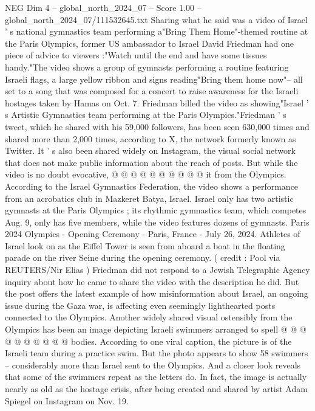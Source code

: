 \begin{textsample}{NEG Dim 4 – global\_north\_2024\_07 – Score 1.00 – global\_north\_2024\_07/111532645.txt}  \label{ex:f4_neg_283}
Sharing what he said was a video of Israel ' s national gymnastics team performing a"Bring Them Home"-themed routine at the Paris Olympics, former US ambassador to Israel David Friedman had one piece of advice to viewers :"Watch until the end and have some tissues handy."The video shows a group of gymnasts performing a routine featuring Israeli flags, a large yellow ribbon and signs reading"Bring them home now"-- all set to a song that was composed for a concert to raise awareness for the Israeli hostages taken by Hamas on Oct. 7.
Friedman billed the video as showing"Israel ' s Artistic Gymnastics team performing at the Paris Olympics."Friedman ' s tweet, which he shared with his 59,000 followers, has been seen 630,000 times and shared more than 2,000 times, according to X, the network formerly known as Twitter.
It ' s also been shared widely on Instagram, the visual social network that does not make public information about the reach of posts.
But while the video is no doubt evocative, @ @ @ @ @ @ @ @ @ @ it from the Olympics.
According to the Israel Gymnastics Federation, the video shows a performance from an acrobatics club in Mazkeret Batya, Israel.
Israel only has two artistic gymnasts at the Paris Olympics ; its rhythmic gymnastics team, which competes Aug. 9, only has five members, while the video features dozens of gymnasts.
Paris 2024 Olympics - Opening Ceremony - Paris, France - July 26, 2024.
Athletes of Israel look on as the Eiffel Tower is seen from aboard a boat in the floating parade on the river Seine during the opening ceremony. ( credit : Pool via REUTERS/Nir Elias ) Friedman did not respond to a Jewish Telegraphic Agency inquiry about how he came to share the video with the description he did.
But the post offers the latest example of how misinformation about Israel, an ongoing issue during the Gaza war, is affecting even seemingly lighthearted posts connected to the Olympics.
Another widely shared visual ostensibly from the Olympics has been an image depicting Israeli swimmers arranged to spell @ @ @ @ @ @ @ @ @ @ bodies.
According to one viral caption, the picture is of the Israeli team during a practice swim.
But the photo appears to show 58 swimmers -- considerably more than Israel sent to the Olympics.
And a closer look reveals that some of the swimmers repeat as the letters do.
In fact, the image is actually nearly as old as the hostage crisis, after being created and shared by artist Adam Spiegel on Instagram on Nov. 19.

\end{textsample}
